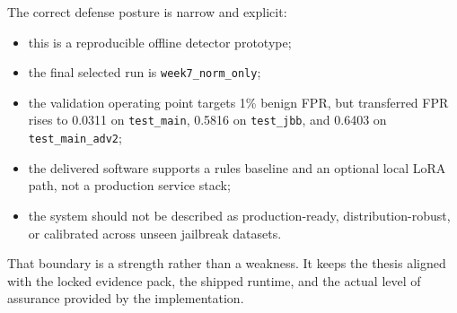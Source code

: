 The correct defense posture is narrow and explicit:
\begin{itemize}
  \item this is a reproducible offline detector prototype;
  \item the final selected run is \texttt{week7\_norm\_only};
  \item the validation operating point targets 1\% benign FPR, but transferred FPR rises to 0.0311 on \texttt{test\_main}, 0.5816 on \texttt{test\_jbb}, and 0.6403 on \texttt{test\_main\_adv2};
  \item the delivered software supports a rules baseline and an optional local LoRA path, not a production service stack;
  \item the system should not be described as production-ready, distribution-robust, or calibrated across unseen jailbreak datasets.
\end{itemize}

That boundary is a strength rather than a weakness. It keeps the thesis aligned with the locked evidence pack, the shipped runtime, and the actual level of assurance provided by the implementation.

